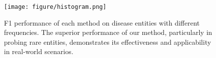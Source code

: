 \begin{figure}[t]
    \centering
    \setlength{\abovecaptionskip}{1mm}
    \texttt{[image: figure/histogram.png]}
    \caption{F1 performance of each method on disease entities with different frequencies. The superior performance of our method, particularly in probing rare entities, demonstrates its effectiveness and applicability in real-world scenarios.}
    \label{fig:freq}
\end{figure}










